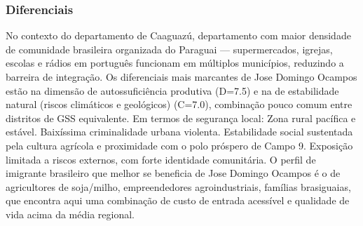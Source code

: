 \subsubsection*{Diferenciais}\label{dif-jose-domingo-ocampos-0515}
No contexto do departamento de Caaguazú, departamento com maior densidade de comunidade brasileira organizada do Paraguai — supermercados, igrejas, escolas e rádios em português funcionam em múltiplos municípios, reduzindo a barreira de integração. Os diferenciais mais marcantes de Jose Domingo Ocampos estão na dimensão de autossuficiência produtiva (D=7.5) e na de estabilidade natural (riscos climáticos e geológicos) (C=7.0), combinação pouco comum entre distritos de GSS equivalente. Em termos de segurança local: Zona rural pacífica e estável. Baixíssima criminalidade urbana violenta. Estabilidade social sustentada pela cultura agrícola e proximidade com o polo próspero de Campo 9. Exposição limitada a riscos externos, com forte identidade comunitária. O perfil de imigrante brasileiro que melhor se beneficia de Jose Domingo Ocampos é o de agricultores de soja/milho, empreendedores agroindustriais, famílias brasiguaias, que encontra aqui uma combinação de custo de entrada acessível e qualidade de vida acima da média regional.
